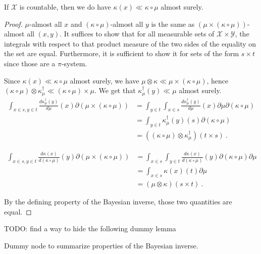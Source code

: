 If $\mathcal{X}$ is countable, then we do have $\kappa(x) \ll \kappa \circ \mu$ almost surely.

\begin{proof}\mathlibok
\uses{}
$\mu$-almost all $x$ and $(\kappa \circ \mu)$-almost all $y$ is the same as $(\mu \times (\kappa \circ \mu))$-almost all $(x, y)$.
It suffices to show that for all measurable sets of $\mathcal X \times \mathcal Y$, the integrals with respect to that product measure of the two sides of the equality on the set are equal. Furthermore, it is sufficient to show it for sets of the form $s \times t$ since those are a $\pi$-system.

Since $\kappa(x) \ll \kappa \circ \mu$ almost surely, we have $\mu \otimes \kappa \ll \mu \times (\kappa \circ \mu)$, hence $(\kappa \circ \mu) \otimes \kappa_\mu^\dagger \ll (\kappa \circ \mu) \times \mu$.
We get that $\kappa_\mu^\dagger(y) \ll \mu$ almost surely.
\begin{align*}
\int_{x \in s, y \in t} \frac{d \kappa_\mu^\dagger(y)}{d \mu}(x) \partial (\mu \times (\kappa \circ \mu))
&= \int_{y \in t} \int_{x \in s} \frac{d \kappa_\mu^\dagger(y)}{d \mu}(x) \partial \mu \partial (\kappa \circ \mu)
\\
&= \int_{y \in t} \kappa_\mu^\dagger(y)(s) \partial (\kappa \circ \mu)
\\
&= ((\kappa \circ \mu) \otimes \kappa_\mu^\dagger) (t \times s)
\: .
\end{align*}

\begin{align*}
\int_{x \in s, y \in t} \frac{d \kappa(x)}{d(\kappa \circ \mu)}(y) \partial (\mu \times (\kappa \circ \mu))
&= \int_{x \in s} \int_{y \in t} \frac{d \kappa(x)}{d(\kappa \circ \mu)}(y) \partial (\kappa \circ \mu) \partial \mu
\\
&= \int_{x \in s} \kappa(x)(t) \partial \mu
\\
&= (\mu \otimes \kappa) (s \times t)
\: .
\end{align*}

By the defining property of the Bayesian inverse, those two quantities are equal.
\end{proof}



TODO: find a way to hide the following dummy lemma
\begin{lemma}
  \label{lem:bayesInv_properties}
  \leanok
  Dummy node to summarize properties of the Bayesian inverse.
\end{lemma}

